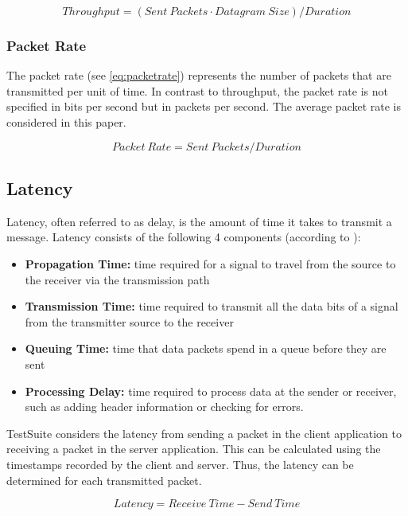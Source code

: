 \begin{equation}
Throughput = (Sent\ Packets \cdot Datagram\ Size) / Duration
\label{eq:throughput}
\end{equation}

\subsubsection{Packet Rate}
The packet rate (see \ref{eq:packetrate}) represents the number of packets that are transmitted per unit of time. In contrast to throughput, the packet rate is not specified in bits per second but in packets per second. The average packet rate is considered in this paper.


\begin{equation}
Packet\ Rate = Sent\ Packets / Duration
\label{eq:packetrate}
\end{equation}

\subsection{Latency}
Latency, often referred to as delay, is the amount of time it takes to transmit a message. Latency consists of the following 4 components (according to \cite{datacalc02}):

\begin{itemize}
	\item \textbf{Propagation Time:} time required for a signal to travel from the source to the receiver via the transmission path
	\item \textbf{Transmission Time:} time required to transmit all the data bits of a signal from the transmitter source to the receiver
	\item \textbf{Queuing Time:} time that data packets spend in a queue before they are sent
	\item \textbf{Processing Delay:} time required to process data at the sender or receiver, such as adding header information or checking for errors.
\end{itemize}

TestSuite considers the latency from sending a packet in the client application to receiving a packet in the server application. This can be calculated using the timestamps recorded by the client and server. Thus, the latency can be determined for each transmitted packet.

\begin{equation}
Latency = Receive\ Time - Send\ Time
\label{eq:latency}
\end{equation}

